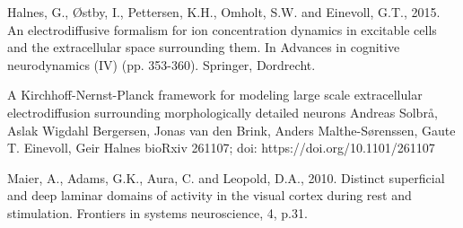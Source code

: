 \documentclass{article}
\begin{document}
\begin{thebibliography}{1}
Halnes, G., Østby, I., Pettersen, K.H., Omholt, S.W. and Einevoll, G.T., 2015. An electrodiffusive formalism for ion concentration dynamics in excitable cells and the extracellular space surrounding them. In Advances in cognitive neurodynamics (IV) (pp. 353-360). Springer, Dordrecht.

A Kirchhoff-Nernst-Planck framework for modeling large scale extracellular electrodiffusion surrounding morphologically detailed neurons
Andreas Solbr\aa, Aslak Wigdahl Bergersen, Jonas van den Brink, Anders Malthe-Sørenssen, Gaute T. Einevoll, Geir Halnes
bioRxiv 261107; doi: https://doi.org/10.1101/261107


Maier, A., Adams, G.K., Aura, C. and Leopold, D.A., 2010. Distinct superficial and deep laminar domains of activity in the visual cortex during rest and stimulation. Frontiers in systems neuroscience, 4, p.31.

\end{thebibliography}
\end{document}

